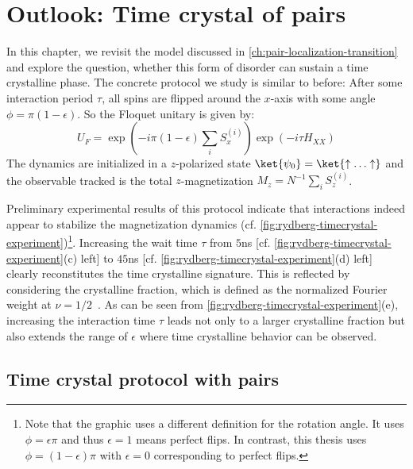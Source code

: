 \chapter{Outlook: Time crystal of pairs}
\label{ch:rydberg-timecrystal}
In this chapter, we revisit the model discussed in \autoref{ch:pair-localization-transition} and explore the question, whether this form of disorder can sustain a time crystalline phase. The concrete protocol we study is similar to before: After some interaction period $\tau$, all spins are flipped around the $x$-axis with some angle $\phi=\pi(1-\epsilon)$. So the Floquet unitary is given by:
\begin{equation}
	U_F = \exp(-i\pi(1-\epsilon)\sum_i S_x^{(i)})\exp(-i\tau H_{XX})
\end{equation}
The dynamics are initialized in a $z$-polarized state $\ket{\psi_0} = \ket{\uparrow\ldots\uparrow}$ and the observable tracked is the total $z$-magnetization $M_z = N^{-1} \sum_i S_z^{(i)}$.

Preliminary experimental results of this protocol indicate that interactions indeed appear to stabilize the magnetization dynamics (cf. \autoref{fig:rydberg-timecrystal-experiment})\footnote{Note that the graphic uses a different definition for the rotation angle. It uses $\phi=\epsilon \pi$ and thus $\epsilon = 1$ means perfect flips. In contrast, this thesis uses $\phi=(1-\epsilon)\pi$ with $\epsilon=0$ corresponding to perfect flips.}. Increasing the wait time $\tau$ from $5$ns [cf. \autoref{fig:rydberg-timecrystal-experiment}(c) left] to $45$ns [cf. \autoref{fig:rydberg-timecrystal-experiment}(d) left] clearly reconstitutes the time crystalline signature. This is reflected by considering the crystalline fraction, which is defined as the normalized Fourier weight at $\nu=1/2$~\cite{choiObservationDiscreteTimecrystalline2017}. As can be seen from \autoref{fig:rydberg-timecrystal-experiment}(e), increasing the interaction time $\tau$ leads not only to a larger crystalline fraction but also extends the range of $\epsilon$ where time crystalline behavior can be observed.

\section{Time crystal protocol with pairs}

